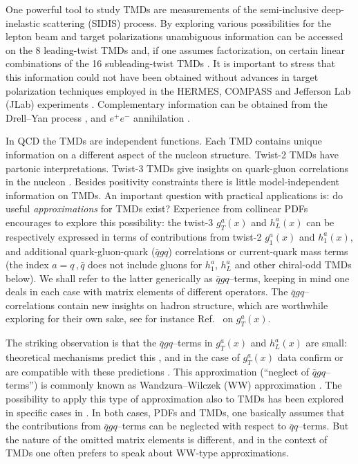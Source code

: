 \documentclass[a4paper,11pt]{article}
\newcommand{\blue}[1]{{\color{blue} #1}}
\newcommand{\ps}[1]{\blue{#1}}
\begin{document}
One powerful tool to study TMDs are measurements of the
semi-inclusive deep-inelastic scattering (SIDIS) process.
By exploring various possibilities for the lepton beam and target
polarizations unambiguous information can be accessed on the 8 leading-twist
TMDs \cite{Boer:1997nt} and, if one assumes factorization, on certain
linear combinations of the 16 subleading-twist TMDs
\cite{Goeke:2005hb,Bacchetta:2006tn}.
	It is important to stress that this information could not have
	been obtained without advances in target polarization techniques
	employed in the HERMES, COMPASS and Jefferson Lab (JLab) experiments
	\cite{Stock:1994vv,Crabb:1997cy,Goertz:2002vv}.
Complementary information can be obtained
from the Drell--Yan process \cite{Arnold:2008kf},
and $e^+e^-$ annihilation \cite{Metz:2016swz}.

In QCD the TMDs are independent functions. Each TMD contains unique
information on a different aspect of the nucleon structure.
Twist-2 TMDs have partonic interpretations. Twist-3 TMDs
give insights on quark-gluon correlations in the nucleon
\cite{Miller:2007ae,Burkardt:2007rv,Burkardt:2009rf}.
Besides positivity constraints \cite{Bacchetta:1999kz}
there is little model-independent information on TMDs.
An important question with practical applications is:
do useful {\sl approximations} for TMDs exist?
Experience from collinear PDFs encourages to explore this possibility:
the twist-3 $g_T^a(x)$ and $h_L^a(x)$ can be respectively expressed
in terms of contributions from twist-2 $g_1^a(x)$ and $h_1^a(x)$, and
additional quark-gluon-quark ($\bar{q}gq$) correlations or current-quark
mass terms \cite{Wandzura:1977qf,Jaffe:1991ra}
(the index $a=q\,,\bar q$ does not include gluons for
$h_1^a$, $h_L^a$ and other chiral-odd TMDs below).
We shall refer to the latter generically as $\bar{q}gq$--terms, keeping in
mind one deals in each case with matrix elements of different operators.
The $\bar{q}gq$--correlations contain new insights on hadron structure,
which are worthwhile exploring for their own sake,
see \ps{for instance Ref.~}\cite{Jaffe:1989xx} on $g_T^a(x)$.

The striking observation is that the $\bar{q}gq$--terms in $g_T^a(x)$
and $h_L^a(x)$ are small: theoretical mechanisms predict this
\cite{Balla:1997hf,Dressler:1999hc,Gockeler:2000ja,Gockeler:2005vw},
and in the case of $g_T^a(x)$ data confirm or are compatible with these
predictions \cite{Abe:1998wq,Anthony:2002hy,Airapetian:2011wu}.
This approximation (``neglect of $\bar{q}gq$--terms'') is commonly
known as Wandzura--Wilczek (WW) approximation \cite{Wandzura:1977qf}.
The possibility to apply this type of approximation also to TMDs has
been explored in specific cases in \cite{Kotzinian:1995cz,Kotzinian:1997wt,
Kotzinian:2006dw,Avakian:2007mv,Metz:2008ib,Teckentrup:2009tk,Tangerman:1994bb}.
In both cases, PDFs and TMDs, one basically assumes that the
contributions from $\bar{q}gq$--terms can be neglected with respect to
$\bar{q}q$--terms. But the nature of the omitted matrix elements is
different, and in the context of TMDs one often prefers to speak
about WW-type approximations.
\end{document}
